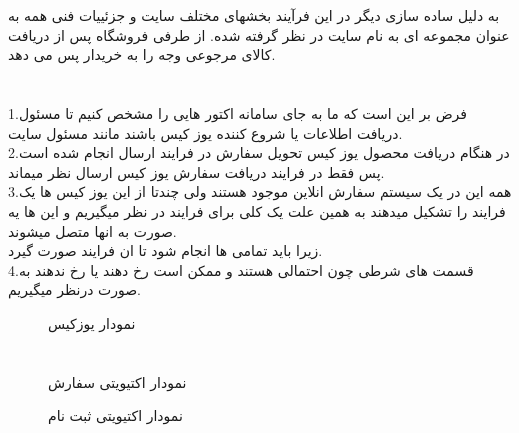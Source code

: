 \documentclass[12pt,onecolumn,a4paper]{article}
\begin{document}
به دلیل ساده سازی دیگر در این فرآیند بخشهای مختلف سایت و جزئییات فنی همه به عنوان مجموعه ای به نام سایت در نظر گرفته شده.
از طرفی فروشگاه پس از دریافت کالای مرجوعی وجه را به خریدار پس می دهد.

\newpage
\section{     }
\begin{figure}[!h]
\end{figure}

\newpage

\begin{figure}[!h]
\end{figure}

\newpage
1.فرض بر این است که ما به جای سامانه اکتور هایی را مشخص کنیم تا مسئول دریافت اطلاعات یا شروع کننده یوز کیس باشند مانند   مسئول سایت.\\
2.در هنگام دریافت محصول یوز کیس تحویل سفارش در فرایند ارسال انجام شده است پس فقط در فرایند دریافت سفارش یوز کیس ارسال نظر میماند.\\
3.همه این  در یک سیستم سفارش انلاین موجود هستند ولی چندتا از این یوز کیس ها یک فرایند را تشکیل میدهند به همین علت یک  کلی برای فرایند در نظر میگیریم و این ها یه صورت به انها متصل میشوند.\\ زیرا باید تمامی  ها انجام شود تا ان فرایند صورت گیرد.\\
4.قسمت های شرطی چون احتمالی هستند و ممکن است رخ دهند یا رخ ندهند به صورت درنظر میگیریم.


\begin{figure}[!h]
\caption{  نمودار یوزکیس }\label{usecase}
\end{figure}

\newpage
\section{     }


\begin{figure}[!h]
\afterpage{\FloatBarrier}
\caption{   نمودار اکتیویتی سفارش }\label{ordact}
\end{figure}



\begin{figure}[!h]
\caption{   نمودار اکتیویتی ثبت نام }\label{regact}
\end{figure}
\end{document}
